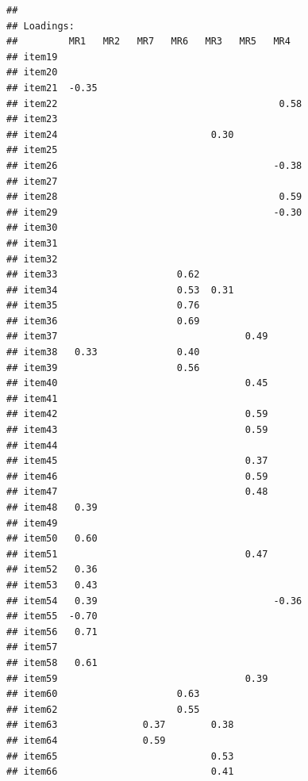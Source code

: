 \documentclass[
  english,
  man]{apa6}
\begin{document}
\begin{verbatim}
## 
## Loadings:
##         MR1   MR2   MR7   MR6   MR3   MR5   MR4  
## item19                                           
## item20                                           
## item21  -0.35                                    
## item22                                       0.58
## item23                                           
## item24                           0.30            
## item25                                           
## item26                                      -0.38
## item27                                           
## item28                                       0.59
## item29                                      -0.30
## item30                                           
## item31                                           
## item32                                           
## item33                     0.62                  
## item34                     0.53  0.31            
## item35                     0.76                  
## item36                     0.69                  
## item37                                 0.49      
## item38   0.33              0.40                  
## item39                     0.56                  
## item40                                 0.45      
## item41                                           
## item42                                 0.59      
## item43                                 0.59      
## item44                                           
## item45                                 0.37      
## item46                                 0.59      
## item47                                 0.48      
## item48   0.39                                    
## item49                                           
## item50   0.60                                    
## item51                                 0.47      
## item52   0.36                                    
## item53   0.43                                    
## item54   0.39                               -0.36
## item55  -0.70                                    
## item56   0.71                                    
## item57                                           
## item58   0.61                                    
## item59                                 0.39      
## item60                     0.63                  
## item62                     0.55                  
## item63               0.37        0.38            
## item64               0.59                        
## item65                           0.53            
## item66                           0.41            

\end{verbatim}
\end{document}
